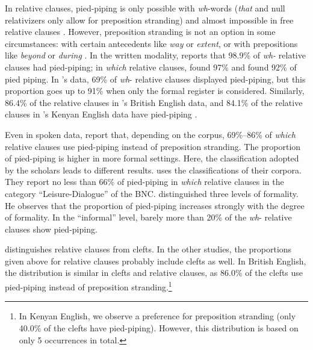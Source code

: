In relative clauses, pied-piping is only possible with \textit{wh}-words (\textit{that} and null relativizers only allow for preposition stranding) and almost impossible in free relative clauses \citep{Hoffmann.2005,Hoffmann.2008,Hoffmann.2011}. However, preposition stranding is not an option in some circumstances: with certain antecedents like \textit{way} or \textit{extent}, or with prepositions like \textit{beyond} or \textit{during} \citep[74--76]{Johansson.1998}. In the written modality, \citet{Trotta.2000} reports that 98.9\% of \textit{wh-} relative clauses had pied-piping; in \textit{which} relative clauses, \citet[70]{Johansson.1998} found 97\% and \citet{Hoffmann.2005} found  92\%  of pied piping. In \citet{Hoffmann.2008}'s data, 69\% of \textit{wh}- relative clauses displayed pied-piping, but this proportion goes up to 91\% when only the formal register is considered. Similarly, 86.4\% of the relative clauses in \citeauthor{Hoffmann.2011}'s British English data, and 84.1\% of the relative clauses in \citeauthor{Hoffmann.2011}'s Kenyan English data have pied-piping \citep[148]{Hoffmann.2011}. 

Even in spoken data, \citet{Johansson.1998} report that, depending on the corpus, 69\%--86\% of \textit{which} relative clauses use pied-piping instead of preposition stranding. 
The proportion of pied-piping is higher in more formal settings. Here, the classification adopted by the scholars leads to different results. \citet[71]{Johansson.1998} uses the %
classifications of their corpora. They report no less than 66\% of pied-piping in \textit{which} relative clauses in the category ``Leisure-Dialogue'' of the BNC. \citet{Hoffmann.2011} distinguished three levels of formality. He observes that the proportion of pied-piping increases strongly with the degree of formality. In the ``informal'' level, barely more than 20\% of the \textit{wh}- relative clauses show pied-piping.

\citet[150]{Hoffmann.2011} distinguishes relative clauses from clefts. In the other studies, the proportions given above for relative clauses probably include clefts as well. In British English, the distribution is similar in clefts and relative clauses, as 86.0\% of the clefts use pied-piping instead of preposition stranding.\footnote{In Kenyan English, we observe a preference for preposition stranding (only 40.0\% of the clefts have pied-piping). However, this distribution is based on only 5 occurrences in total.} 


